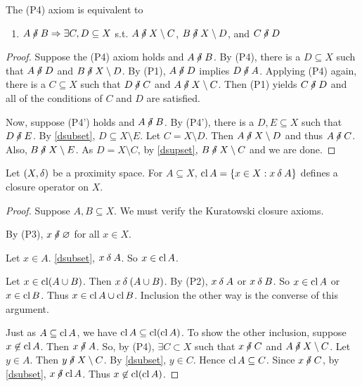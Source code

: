 \begin{theorem}
	The (P4) axiom is equivalent to
	\begin{enumerate}[label={(P\arabic*')},ref={(P\arabic*')},start=4]
		\item \label{P4'}
			\( A \nnear B \implies \exists C,D \subseteq X \) s.t. \( A \nnear X \setminus C \), \( B \nnear X \setminus D \), and \( C \nnear D \)
	\end{enumerate}
\end{theorem}
\begin{proof}
	Suppose the (P4) axiom holds and \( A \nnear B \).  By (P4), there is a \( D \subseteq X \) such that \( A \nnear D \) and \( B \nnear X \setminus D \).  By (P1), \( A \nnear D \) implies \( D \nnear A \).  Applying (P4) again, there is a \( C \subseteq X \) such that \( D \nnear C \) and \( A \nnear X \setminus C \).  Then (P1) yields \( C \nnear D \) and all of the conditions of \( C \) and \( D \) are satisfied.
	
	Now, suppose (P4') holds and \( A \nnear B \).  By (P4'), there is a \( D,E \subseteq X \) such that \( D \nnear E \).  By \ref{dsubset}, \( D \subseteq X \setminus E \).  Let \( C = X \setminus D \).  Then \( A \nnear X \setminus D \) and thus \( A \nnear C \).  Also, \( B \nnear X \setminus E \).  As \( D = X \setminus C \), by \ref{dsupset}, \( B \nnear X \setminus C \) and we are done.
\end{proof}

\begin{proposition}
	\label{deltaclosure}
	Let \( (X, \mathbin{\delta}) \) be a proximity space.  For \( A \subseteq X \), \( \operatorname{cl}{A} = \{ x \in X: x \mathbin{\delta} A \} \) defines a closure operator on \( X \).
\end{proposition}
\begin{proof}
	Suppose \( A,B \subseteq X \).  We must verify the Kuratowski closure axioms.
	
	\prooflabel{\( \cl{\emptyset} = \emptyset \)}
	By (P3), \( x \nnear \emptyset \) for all \( x \in X \).
	
	Let \( x \in A \).  \ref{dsubset}, \( x \mathbin{\delta} A \).  So \( x \in \operatorname{cl}{A} \).
	
	Let \( x \in \operatorname{cl}(A \cup B) \).  Then \( x \mathbin{\delta} (A \cup B) \).  By (P2), \( x \mathbin{\delta} A \) or \( x \mathbin{\delta} B \).  So \( x \in \operatorname{cl}{A} \) or \( x \in \operatorname{cl}{B} \).  Thus \( x \in \operatorname{cl}{A} \cup \operatorname{cl}{B} \).  Inclusion the other way is the converse of this argument.
	
	Just as \( A \subseteq \operatorname{cl}{A} \), we have \( \operatorname{cl}{A} \subseteq \operatorname{cl}(\operatorname{cl}{A}) \).  To show the other inclusion, suppose \( x \not\in \operatorname{cl}{A} \).  Then \( x \nnear A \).  So, by (P4), \( \exists C \subset X \) such that \( x \nnear C \) and \( A \nnear X \setminus C \).  Let \( y \in A \).  Then \( y \nnear X \setminus C \).  By \ref{dsubset}, \( y \in C \).  Hence \( \operatorname{cl}{A} \subseteq C \).  Since \( x \nnear C \), by \ref{dsubset}, \( x \nnear \cl{A} \).  Thus \( x \not\in \operatorname{cl}(\operatorname{cl}{A}) \).
\end{proof}

